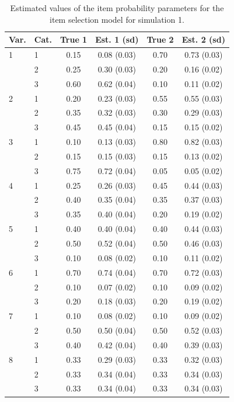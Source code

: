 \documentclass[11pt]{article}
\theoremstyle{plain}
\theoremstyle{definition}
\begin{document}
\begin{table}[H]
  \centering
\begin{tabular}{llcccc}
\toprule
\textbf{Var.} & \textbf{Cat.} & \textbf{True 1} & \textbf{Est. 1 (sd)} & \textbf{True 2} & \textbf{Est. 2 (sd)}  \\
\midrule
1 & 1 & 0.15 & 0.08 (0.03) & 0.70 &  0.73 (0.03)   \\
  & 2 & 0.25 & 0.30 (0.03) & 0.20 &  0.16 (0.02)  \\
  & 3 & 0.60 & 0.62 (0.04) & 0.10 &  0.11 (0.02)  \\
2 & 1 & 0.20 & 0.23 (0.03) & 0.55 &  0.55 (0.03)   \\
  & 2 & 0.35 & 0.32 (0.03) & 0.30 &  0.29 (0.03)   \\
  & 3 & 0.45 & 0.45 (0.04) & 0.15 &  0.15 (0.02)  \\
3 & 1 & 0.10 & 0.13 (0.03) & 0.80 &  0.82 (0.03)  \\
  & 2 & 0.15 & 0.15 (0.03) & 0.15 &  0.13 (0.02)    \\
  & 3 & 0.75 & 0.72 (0.04) & 0.05 &  0.05 (0.02)  \\       
4 & 1 & 0.25 & 0.26 (0.03) & 0.45 &  0.44 (0.03)   \\
  & 2 & 0.40 & 0.35 (0.04) & 0.35 &  0.37 (0.03)   \\
  & 3 & 0.35 & 0.40 (0.04) & 0.20 &  0.19 (0.02)   \\
5 & 1 & 0.40 & 0.40 (0.04) & 0.40 &  0.44 (0.03) \\
  & 2 & 0.50 & 0.52 (0.04) & 0.50 &  0.46 (0.03)  \\
  & 3 & 0.10 & 0.08 (0.02) & 0.10 &  0.11 (0.02)  \\
6 & 1 & 0.70 & 0.74 (0.04) & 0.70 &  0.72 (0.03)   \\
  & 2 & 0.10 & 0.07 (0.02) & 0.10 &  0.09 (0.02)  \\
  & 3 & 0.20 & 0.18 (0.03) & 0.20 &  0.19 (0.02) \\
7 & 1 & 0.10 & 0.08 (0.02) & 0.10 &  0.09 (0.02)  \\
  & 2 & 0.50 & 0.50 (0.04) & 0.50 &  0.52 (0.03)   \\
  & 3 & 0.40 & 0.42 (0.04) & 0.40 &  0.39 (0.03)  \\  
8 & 1 & 0.33 & 0.29 (0.03) & 0.33 &  0.32 (0.03) \\
  & 2 & 0.33 & 0.34 (0.04) & 0.33 &  0.34 (0.03)  \\
  & 3 & 0.33 & 0.34 (0.04) & 0.33 &  0.34 (0.03)  \\  
\bottomrule
\end{tabular}
\caption{Estimated values of the item probability parameters for the item selection model for simulation 1.}
  \label{table:sim1_item_prob_estimates_itemsel}
\end{table}
\end{document}
